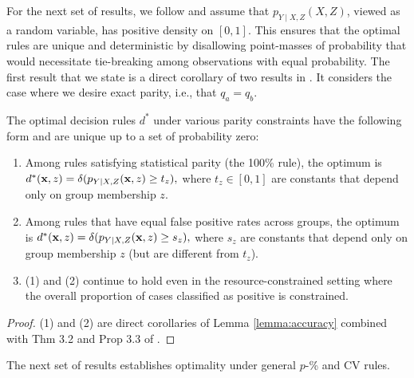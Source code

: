 For the next set of results,
we follow \cite{corbett2017algorithmic} 
and assume that $p_{Y\mid X,Z}(X,Z)$, 
viewed as a random variable, 
has positive density on $[0,1]$.  
This ensures that the optimal rules 
are unique and deterministic 
by disallowing point-masses of probability 
that would necessitate tie-breaking 
among observations with equal probability.  
The first result that we state 
is a direct corollary 
of two results in \cite{corbett2017algorithmic}.  
It considers the case 
where we desire exact parity, i.e., 
that $q_a = q_b$.  

\begin{cor}
 The optimal decision rules $d^*$ 
 under various parity constraints 
 have the following form 
 and are unique up to a set of probability zero: 
 \begin{enumerate}
 \item Among rules satisfying statistical parity (the 100\% rule), the optimum is
$d^*(\mathbf x,z) = \delta(p_{Y|X, Z}(\mathbf x,z) \ge t_z),$
 where $t_z \in [0,1]$ are constants 
 that depend only on group membership $z$. 
 \item Among rules that have equal false positive rates across groups, the optimum is
 $d^*(\mathbf x,z) = \delta(p_{Y|X, Z}(\mathbf x,z) \ge s_z),$
 where $s_z$ are constants 
 that depend only on group membership $z$ 
 (but are different from $t_z$).
 \item (1) and (2) continue to hold 
 even in the resource-constrained setting 
 where the overall proportion of cases classified as positive is constrained.
 \end{enumerate}
\end{cor}

\begin{proof}
(1) and (2) are direct corollaries of Lemma \ref{lemma:accuracy} combined with Thm 3.2 and Prop 3.3 of \cite{corbett2017algorithmic}. 
\end{proof}

The next set of results establishes optimality 
under general $p$-\% and CV rules.


